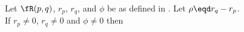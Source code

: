 \begin{theorem}
\label{thm:Rpq}
Let $\fR(p,q)$, $r_p$, $r_q$, and $\phi$ be as defined in .
Let $\rho\eqd r_q-r_p$.\\
If $r_p\neq0$, $r_q\neq0$ and $\phi\neq0$ then 
\\
\end{theorem}
